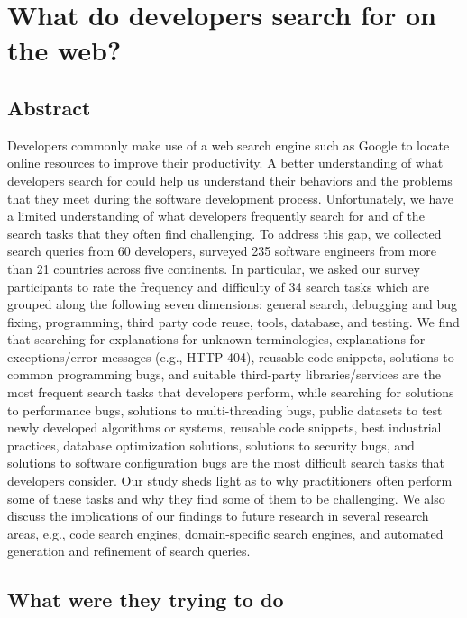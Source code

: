 \section{What do developers search for on the web?}

\subsection{Abstract}

Developers commonly make use of a web search engine such as Google to locate online resources to improve their productivity. A better understanding of what developers search for could help us understand their behaviors and the problems that they meet during the software development process. Unfortunately, we have a limited understanding of what developers frequently search for and of the search tasks that they often find challenging. To address this gap, we collected search queries from 60 developers, surveyed 235 software engineers from more than 21 countries across five continents. In particular, we asked our survey participants to rate the frequency and difficulty of 34 search tasks which are grouped along the following seven dimensions: general search, debugging and bug fixing, programming, third party code reuse, tools, database, and testing. We find that searching for explanations for unknown terminologies, explanations for exceptions/error messages (e.g., HTTP 404), reusable code snippets, solutions to common programming bugs, and suitable third-party libraries/services are the most frequent search tasks that developers perform, while searching for solutions to performance bugs, solutions to multi-threading bugs, public datasets to test newly developed algorithms or systems, reusable code snippets, best industrial practices, database optimization solutions, solutions to security bugs, and solutions to software configuration bugs are the most difficult search tasks that developers consider. Our study sheds light as to why practitioners often perform some of these tasks and why they find some of them to be challenging. We also discuss the implications of our findings to future research in several research areas, e.g., code search engines, domain-specific search engines, and automated generation and refinement of search queries.

\subsection{What were they trying to do}

